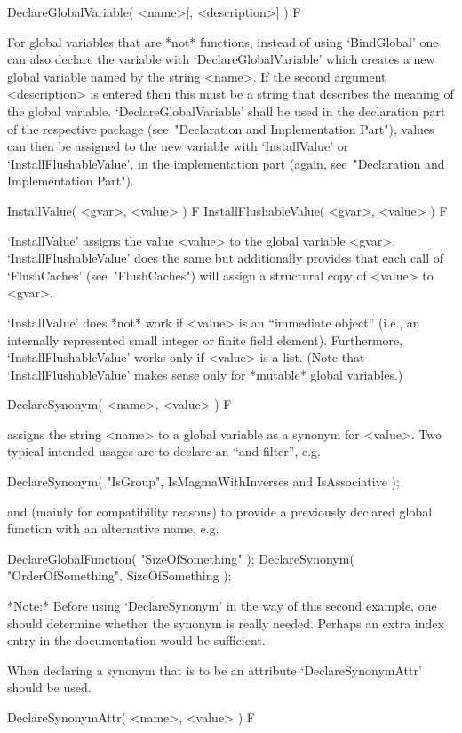 \>DeclareGlobalVariable( <name>[, <description>] ) F

For global variables that are *not* functions,
instead of using `BindGlobal' one can also declare the variable with
`DeclareGlobalVariable' 
which creates a new global variable named by the string <name>.
If the second argument <description> is entered then this must be
a string that describes the meaning of the global variable.
`DeclareGlobalVariable' shall be used in the declaration part of the
respective package (see~"Declaration and Implementation Part"),
values can then be assigned to the new variable with `InstallValue' or
`InstallFlushableValue', in the implementation part
(again, see~"Declaration and Implementation Part").

\>InstallValue( <gvar>, <value> ) F
\>InstallFlushableValue( <gvar>, <value> ) F

`InstallValue' assigns the value <value> to the global variable <gvar>.
`InstallFlushableValue' does the same but additionally provides that
each call of `FlushCaches' (see~"FlushCaches")
will assign a structural copy of <value> to <gvar>.

`InstallValue' does *not* work if <value> is an ``immediate object''
(i.e., an internally represented small integer or finite field element).
Furthermore, `InstallFlushableValue' works only if <value> is a list.
(Note that `InstallFlushableValue' makes sense only for *mutable*
global variables.)

\>DeclareSynonym( <name>, <value> ) F

assigns the string <name> to a global variable as a synonym for <value>.
Two typical intended usages are to declare an ``and-filter'', e.g.

\begintt
DeclareSynonym( "IsGroup", IsMagmaWithInverses and IsAssociative );
\endtt

and (mainly for compatibility reasons) to provide a previously declared
global function with an alternative name, e.g.

\begintt
DeclareGlobalFunction( "SizeOfSomething" );
DeclareSynonym( "OrderOfSomething", SizeOfSomething );
\endtt

*Note:* Before using `DeclareSynonym' in the way of this second example,
one should determine whether the synonym is really needed. Perhaps an
extra index entry in the documentation would be sufficient. 

When declaring a synonym that is to be an attribute `DeclareSynonymAttr'
should be used.

\>DeclareSynonymAttr( <name>, <value> ) F

